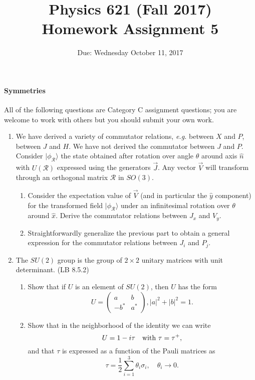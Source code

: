 \documentclass[letterpaper,11pt]{article}
\title{Physics 621 (Fall 2017) \\ Homework Assignment 5}
\date{Due: Wednesday October 11, 2017}
\begin{document}
\maketitle

\paragraph*{Symmetries}

All of the following questions are Category C assignment questions; you are welcome to work with others but you should submit your own work.

\begin{enumerate}
  \item We have derived a variety of commutator relations, \textit{e.g.} between $X$ and $P$, between $J$ and $H$. We have not derived the commutator between $J$ and $P$. Consider $|\phi_\mathcal{R}\rangle$ the state obtained after rotation over angle $\theta$ around axis $\hat{n}$ with $U(\mathcal{R})$ expressed using the generators $\vec{J}$. Any vector $\vec{V}$ will transform through an orthogonal matrix $\mathcal{R}$ in $SO(3)$.
  \begin{enumerate}
    \item Consider the expectation value of $\vec{V}$ (and in particular the $\hat{y}$ component) for the transformed field $|\phi_\mathcal{R}\rangle$ under an infinitesimal rotation over $\theta$ around $\hat{x}$. Derive the commutator relations between $J_x$ and $V_y$.
    \item Straightforwardly generalize the previous part to obtain a general expression for the commutator relations between $J_i$ and $P_j$.
  \end{enumerate}
  \item The $SU(2)$ group is the group of $2 \times 2$ unitary matrices with unit determinant. (LB 8.5.2)
  \begin{enumerate}
    \item Show that if $U$ is an element of $SU(2)$, then $U$ has the form
    $$ U = \left( \begin{array}{cc} a & b \\ -b^* & a^* \end{array} \right), |a|^2 + |b|^2 = 1.$$
    \item Show that in the neighborhood of the identity we can write
    $$ U = 1 - i\tau \quad \hbox{with}~\tau = \tau^+, $$
    and that $\tau$ is expressed as a function of the Pauli matrices as
    $$ \tau = \frac{1}{2} \sum_{i=1}^{3} \theta_i \sigma_i, \quad \theta_i \to 0. $$

\end{enumerate}
\end{enumerate}
\end{document}
